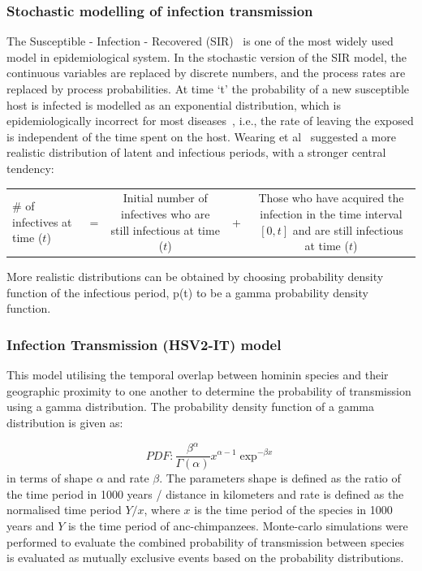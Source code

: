 \documentclass[fleqn,10pt]{wlscirep}
\begin{document}
\subsubsection*{Stochastic modelling of infection transmission}
The Susceptible - Infection - Recovered (SIR)~\cite{callahanspread} is one of the most widely used model in epidemiological system. In the stochastic version of the SIR model, the continuous variables are replaced by discrete numbers, and the process rates are replaced by process probabilities. At time `t' the probability of a new susceptible host is infected is modelled as an exponential distribution, which is epidemiologically incorrect for most diseases~\cite{Wearing2005,Bailey1975,sartwell1950distribution}, i.e., the rate of leaving the exposed is independent of the time spent on the host. Wearing et al~\cite{Wearing2005} suggested a more realistic distribution of latent and infectious periods, with a stronger central tendency:

\begin{table}[!h]
	\centering
	\renewcommand{\arraystretch}{1.5}
	\begin{tabulary}{\linewidth}{LCCCC}
		\# of infectives at time ($t$) & =  & 
		Initial number of infectives who are still infectious at time ($t$) & + & 
 Those who have acquired the infection in the time interval $[0, t]$ and are still infectious at time ($t$)			\\ 
\end{tabulary}
\end{table}

More realistic distributions can be obtained by choosing  probability density function of the infectious period,  p(t) to be a gamma probability density function\cite{Blythe1988,Lloyd2001}.

\subsubsection*{Infection Transmission (HSV2-IT) model}
This model utilising the temporal overlap between hominin species and their geographic proximity to one another to determine the probability of transmission using a gamma distribution. The probability density function of a gamma distribution is given as:

\begin{equation}
PDF:\frac{\beta^\alpha}{\Gamma(\alpha)}x^{\alpha - 1} \exp^{-\beta x}
\end{equation}
in terms of shape $\alpha$ and rate $\beta$. The parameters shape is defined as the ratio of the time period in 1000 years / distance in kilometers and  rate  is defined as the normalised time period $Y / x$, where $x$ is the time period of the species in 1000 years and $Y$ is the time period of anc-chimpanzees. Monte-carlo simulations were performed to evaluate the combined probability of transmission between species is evaluated as mutually exclusive events based on the probability distributions. 
\end{document}
